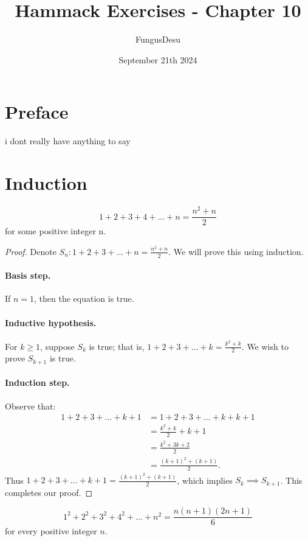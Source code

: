 \documentclass{exam}
\title{Hammack Exercises - Chapter 10}
\author{FungusDesu}
\date{September 21th 2024}
\begin{document}
\maketitle

\section{Preface}
i dont really have anything to say

\section{Induction}

\begin{proposition}{10.1}
    $$1+2+3+4+\dots+n=\frac{n^2+n}2$$ for some positive integer n.
\end{proposition}

\begin{proof}
    Denote $S_n: 1 + 2 + 3 + \dots + n=\frac{n^2+n}{2}$. We will prove this using induction. 
    \paragraph{Basis step.} If $n= 1$, then the equation is true.
    \paragraph{Inductive hypothesis.} For $k\ge 1$, suppose $S_k$ is true; that is, $1 + 2 + 3 +\dots + k = \frac{k^2+k}2$. We wish to prove $S_{k+1}$ is true.
    \paragraph{Induction step.} Observe that:
    \begin{align*}
        1 + 2 + 3 +\dots + k + 1 &= 1 + 2 + 3 + \dots + k + k + 1\\
        &=\frac{k^2 + k}2 + k + 1\\
        &=\frac{k^2 + 3k + 2}{2}\\
        &=\frac{(k+1)^2+(k+1)}2.
    \end{align*}
    Thus $1 + 2 + 3 +\dots + k + 1 = \frac{(k+1)^2+(k+1)}2$, which implies $S_k\implies S_{k+1}$. This completes our proof.
\end{proof}

\begin{proposition}{10.2}
    $$1^2+2^2+3^2+4^2+\dots+n^2=\frac{n(n+1)(2n+1)}6$$ for every positive integer $n$.
\end{proposition}
\end{document}

